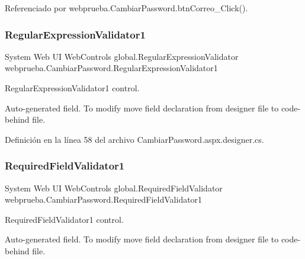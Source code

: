 Referenciado por webprueba.\+Cambiar\+Password.\+btn\+Correo\+\_\+\+Click().

\mbox{\label{classwebprueba_1_1_cambiar_password_a5abb9a75014840a69a4233e6a75569b2}} 
\subsubsection{\texorpdfstring{RegularExpressionValidator1}{RegularExpressionValidator1}}
{\footnotesize\ttfamily System Web UI Web\+Controls global.\+Regular\+Expression\+Validator webprueba.\+Cambiar\+Password.\+Regular\+Expression\+Validator1\hspace{0.3cm}{\ttfamily [protected]}}



Regular\+Expression\+Validator1 control. 

Auto-\/generated field. To modify move field declaration from designer file to code-\/behind file. 

Definición en la línea 58 del archivo Cambiar\+Password.\+aspx.\+designer.\+cs.

\mbox{\label{classwebprueba_1_1_cambiar_password_aa5b8d9938e44f22494427dc175cd4789}} 
\subsubsection{\texorpdfstring{RequiredFieldValidator1}{RequiredFieldValidator1}}
{\footnotesize\ttfamily System Web UI Web\+Controls global.\+Required\+Field\+Validator webprueba.\+Cambiar\+Password.\+Required\+Field\+Validator1\hspace{0.3cm}{\ttfamily [protected]}}



Required\+Field\+Validator1 control. 

Auto-\/generated field. To modify move field declaration from designer file to code-\/behind file. 

